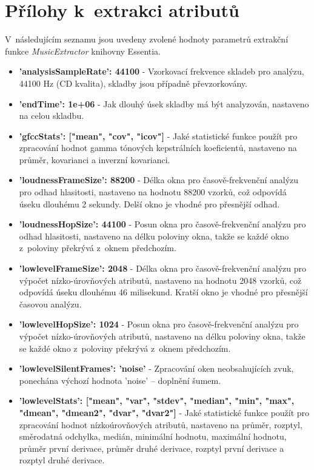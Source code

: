 
\chapter{Přílohy k~extrakci atributů}
\label{prilohy_k_extrakci_atributu}

V~následujícím seznamu jsou uvedeny zvolené hodnoty parametrů extrakční funkce \textit{MusicExtractor} knihovny Essentia.

\begin{itemize}
    \item \textbf{'analysisSampleRate': 44100} - Vzorkovací frekvence skladeb pro analýzu, 44100 Hz (CD kvalita), skladby jsou případně převzorkovány.
    \item \textbf{'endTime': 1e+06} - Jak dlouhý úsek skladby má být analyzován, nastaveno na celou skladbu.
    \item \textbf{'gfccStats': ["mean", "cov", "icov"]} - Jaké statistické funkce použít pro zpracování hodnot gamma tónových kepstrálních koeficientů, nastaveno na průměr, kovarianci a inverzní kovarianci.
    \item \textbf{'loudnessFrameSize': 88200} - Délka okna pro časově-frekvenční analýzu pro odhad hlasitosti, nastaveno na hodnotu 88200 vzorků, což odpovídá úseku dlouhému 2 sekundy. Delší okno je vhodné pro přesnější odhad.
    \item \textbf{'loudnessHopSize': 44100} - Posun okna pro časově-frekvenční analýzu pro odhad hlasitosti, nastaveno na délku poloviny okna, takže se každé okno z~poloviny překrývá z~oknem předchozím.
    \item \textbf{'lowlevelFrameSize': 2048} - Délka okna pro časově-frekvenční analýzu pro výpočet nízko-úrovňových atributů, nastaveno na hodnotu 2048 vzorků, což odpovídá úseku dlouhému 46 milisekund. Kratší okno je vhodné pro přesnější časovou analýzu.
    \item \textbf{'lowlevelHopSize': 1024} - Posun okna pro časově-frekvenční analýzu pro výpočet nízko-úrovňových atributů, nastaveno na délku poloviny okna, takže se každé okno z~poloviny překrývá z~oknem předchozím.
    \item \textbf{'lowlevelSilentFrames': 'noise'} - Zpracování oken neobsahujících zvuk, ponechána výchozí hodnota 'noise' -- doplnění šumem.
    \item \textbf{'lowlevelStats': ["mean", "var", "stdev", "median", "min", "max", "dmean", "dmean2", "dvar", "dvar2"]} - Jaké statistické funkce použít pro zpracování hodnot nízkoúrovňových atributů, nastaveno na průměr, rozptyl, směrodatná odchylka, medián, minimální hodnotu, maximální hodnotu, průměr první derivace, průměr druhé derivace, rozptyl první derivace a rozptyl druhé derivace.

\end{itemize}
